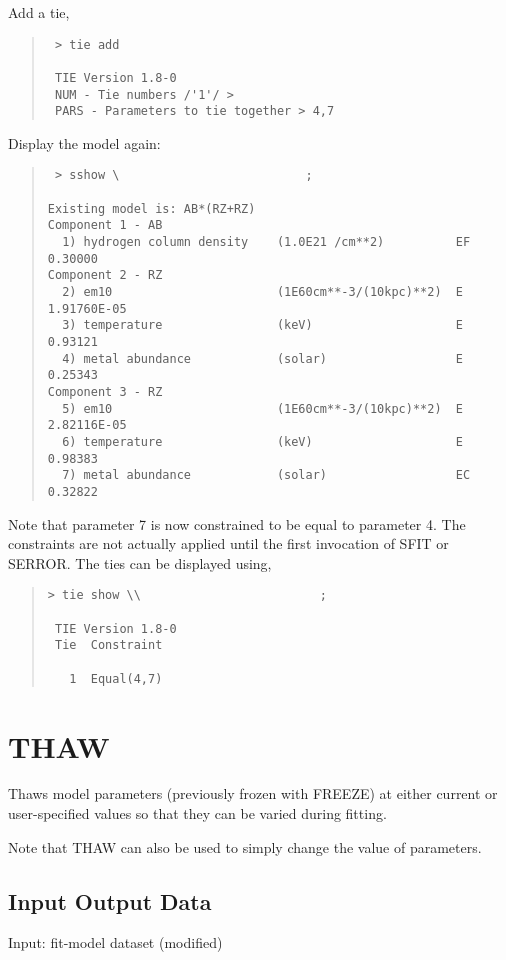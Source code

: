 \documentclass{book}
\renewcommand{\_}{{\tt\char'137}}     %
\begin{document}
Add a tie,
\begin{quote}\begin{verbatim}
 > tie add
 
 TIE Version 1.8-0
 NUM - Tie numbers /'1'/ >
 PARS - Parameters to tie together > 4,7
\end{verbatim}\end{quote}
Display the model again:
\begin{quote}\begin{verbatim}
 > sshow \                          ;
 
Existing model is: AB*(RZ+RZ)
Component 1 - AB
  1) hydrogen column density    (1.0E21 /cm**2)          EF  0.30000
Component 2 - RZ
  2) em10                       (1E60cm**-3/(10kpc)**2)  E   1.91760E-05
  3) temperature                (keV)                    E   0.93121
  4) metal abundance            (solar)                  E   0.25343
Component 3 - RZ
  5) em10                       (1E60cm**-3/(10kpc)**2)  E   2.82116E-05
  6) temperature                (keV)                    E   0.98383
  7) metal abundance            (solar)                  EC  0.32822
\end{verbatim}\end{quote}
Note that parameter 7 is now constrained to be equal to parameter 4. The
constraints are not actually applied until the first invocation of SFIT
or SERROR. The ties can be displayed using,
\begin{quote}\begin{verbatim}
> tie show \\                         ;
 
 TIE Version 1.8-0
 Tie  Constraint
 
   1  Equal(4,7)
\end{verbatim}\end{quote}
\section{THAW}
Thaws model parameters (previously frozen with FREEZE) at either
current or user-specified values so that they can be varied
during fitting.
 
Note that THAW can also be used to simply change the value of
parameters.
 
\subsection{Input Output Data}
Input: fit-model dataset (modified)
\end{document}
